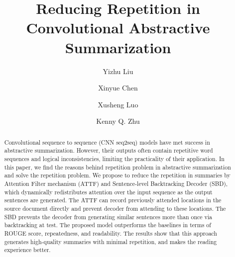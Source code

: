 \documentclass{nle}
\theoremstyle{definition}
\begin{document}
\label{firstpage}




\title{Reducing Repetition in Convolutional Abstractive Summarization}

\begin{authgrp}
\author{Yizhu Liu}
\author{Xinyue Chen}
\author{Xusheng Luo}
\author{ Kenny Q. Zhu}
\end{authgrp}


\begin{abstract}
Convolutional sequence to sequence (CNN seq2seq) models have met success in abstractive summarization. However, their outputs often contain repetitive word sequences and logical inconsistencies,
limiting the practicality of their application. 
In this paper, we find the reasons behind repetition problem in abstractive summarization and solve the repetition problem.
We propose to reduce the repetition in summaries by 
Attention Filter mechanism (ATTF) and Sentence-level Backtracking Decoder (SBD),
which dynamically redistributes attention over the input sequence 
as the output sentences are generated. 
The ATTF can record previously attended locations in the source document directly and prevent decoder from attending to these locations. The SBD prevents the decoder from generating similar sentences more than once via backtracking at test.
The proposed model outperforms the baselines 
in terms of ROUGE score, repeatedness, and readability. 
The results show that this approach 
generates high-quality summaries with minimal repetition,
and makes the reading experience better.
\end{abstract}

\maketitle








\label{lastpage}
\end{document}
